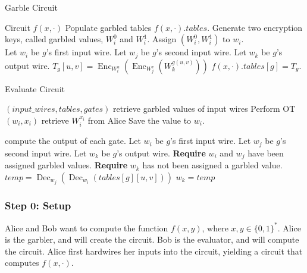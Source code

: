 \documentclass[12pt,twoside]{reedthesis}
\newcommand{\Enc}{\operatorname{Enc}}
\newcommand{\Dec}{\operatorname{Dec}}
\begin{document}
\begin{algorithm}
\caption{Garble Circuit}
\label{alg:garble}
\begin{algorithmic}
    \Require Circuit $f(x,\cdot)$ 
    \Ensure Populate garbled tables $f(x,\cdot).tables$.
    \State Generate two encryption keys, called garbled values, $W_i^0$ and $W_i^1$.
    \State Assign $(W_i^0, W_i^1)$ to $w_i$.
\EndFor \\

    \State Let $w_i$ be $g$'s first input wire.
    \State Let $w_j$ be $g$'s second input wire.
    \State Let $w_k$ be $g$'s output wire.
    \State $T_g[u,v] = \Enc_{W_i^u}( \Enc_{W_j^v} ( W_k^{g(u,v)}))$
    \EndFor
    \State $f(x,\cdot).tables[g] = T_g$.
\EndFor
\end{algorithmic}
\end{algorithm}

\begin{algorithm}
\caption{Evaluate Circuit}
\label{alg:evaluate}
\begin{algorithmic}

\Require $(input\_wires, tables, gates)$
	\Comment retrieve garbled values of input wires
	\State Perform OT$(w_i, x_i)$ 
	\Comment retrieve $W^{x_i}_i$ from Alice
	\State Save the value to $w_i$.
\EndFor

	\Comment compute the output of each gate.
	\State Let $w_i$ be $g$'s first input wire.
	\State Let $w_j$ be $g$'s second input wire.
	\State Let $w_k$ be $g$'s output wire.
	\State \textbf{Require} $w_i$ and $w_j$ have been assigned garbled values.
	\State \textbf{Require} $w_k$ has not been assigned a garbled value.
		\State $temp = \Dec_{w_j}(\Dec_{w_i}(tables[g][u,v]))$
			\State $w_k = temp$
		\EndIf
	\EndFor
\EndFor
\end{algorithmic}
\end{algorithm}

\subsubsection{Step 0: Setup}
Alice and Bob want to compute the function $f(x,y)$, where $x,y \in \{0,1\}^*$.
Alice is the garbler, and will create the circuit.
Bob is the evaluator, and will compute the circuit.
Alice first hardwires her inputs into the circuit, yielding a circuit that computes $f(x,\cdot)$.
\end{document}
